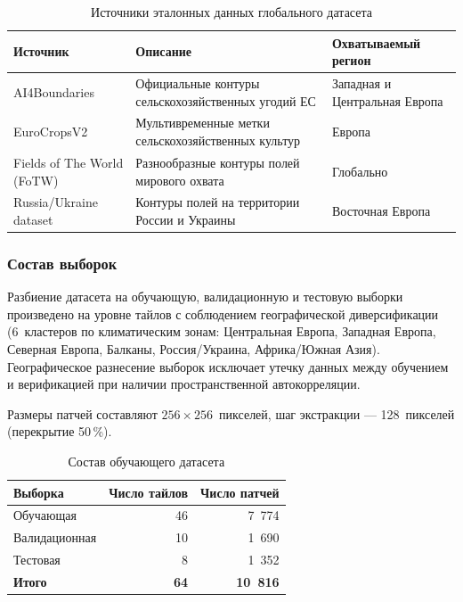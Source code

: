 \documentclass[14pt,a4paper]{extarticle}
\begin{document}
\begin{table}[h!]
\caption{Источники эталонных данных глобального датасета}
\label{tab:gt_sources}
\begin{tabularx}{\textwidth}{L{44mm}L{60mm}X}
\toprule
\textbf{Источник} & \textbf{Описание} & \textbf{Охватываемый регион} \\
\midrule
AI4Boundaries           & Официальные контуры сельскохозяйственных угодий ЕС   & Западная и Центральная Европа \\
EuroCropsV2             & Мультивременные метки сельскохозяйственных культур   & Европа \\
Fields of The World (FoTW) & Разнообразные контуры полей мирового охвата       & Глобально \\
Russia/Ukraine dataset  & Контуры полей на территории России и Украины         & Восточная Европа \\
\bottomrule
\end{tabularx}
\end{table}

\subsubsection{Состав выборок}

Разбиение датасета на обучающую, валидационную и тестовую выборки произведено
на уровне тайлов с соблюдением географической диверсификации (6~кластеров
по климатическим зонам: Центральная Европа, Западная Европа, Северная Европа,
Балканы, Россия/Украина, Африка/Южная Азия). Географическое разнесение
выборок исключает утечку данных между обучением и верификацией при наличии
пространственной автокорреляции.

Размеры патчей составляют $256 \times 256$~пикселей, шаг экстракции —
128~пикселей (перекрытие 50\,\%).

\begin{table}[h!]
\caption{Состав обучающего датасета}
\label{tab:splits}
\begin{tabularx}{\textwidth}{Xrr}
\toprule
\textbf{Выборка} & \textbf{Число тайлов} & \textbf{Число патчей} \\
\midrule
Обучающая    & 46 & 7~774 \\
Валидационная & 10 & 1~690 \\
Тестовая      & 8  & 1~352 \\
\midrule
\textbf{Итого}& \textbf{64} & \textbf{10~816} \\
\bottomrule
\end{tabularx}
\end{table}
\end{document}
